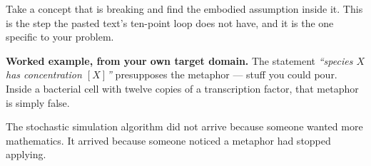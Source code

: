 \begin{movebox}[title={MOVE 1 --- Audit the metaphor that is failing}]
Take a concept that is breaking and find the embodied assumption inside it. This is the step the
pasted text's ten-point loop does not have, and it is the one specific to your problem.

\textbf{Worked example, from your own target domain.} The statement \emph{``species $X$ has
concentration $[X]$''} presupposes the  metaphor --- stuff you could pour.
Inside a bacterial cell with twelve copies of a transcription factor, that metaphor is simply false.
\begin{center}
\end{center}
\vspace{-2pt}
The stochastic simulation algorithm did not arrive because someone wanted more mathematics. It
arrived because someone noticed a metaphor had stopped applying.
\end{movebox}

